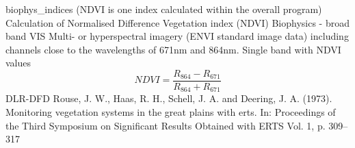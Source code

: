 %
{ %
biophys\_indices (NDVI is one index calculated within the overall program)
}
%
{ %
Calculation of Normalised Difference Vegetation index (NDVI)
}
%
{ %
Biophysics - broad band VIS
}
%
{ %
Multi- or hyperspectral imagery (ENVI standard image data) including channels close to the wavelengths of 671nm and 864nm.\bigskip
}
%
{ %
Single band with NDVI values
}
%
{ %
\begin{displaymath}
NDVI = \frac{R_{864}-R_{671}}{R_{864}+R_{671}}
\end{displaymath}
}
%
{ %
DLR-DFD
}
%
{ %
Rouse, J. W., Haas, R. H., Schell, J. A. and Deering, J. A. (1973). Monitoring vegetation systems in the great plains with erts. In: Proceedings of the Third Symposium on Significant Results Obtained with ERTS  Vol. 1, p. 309–317
}


